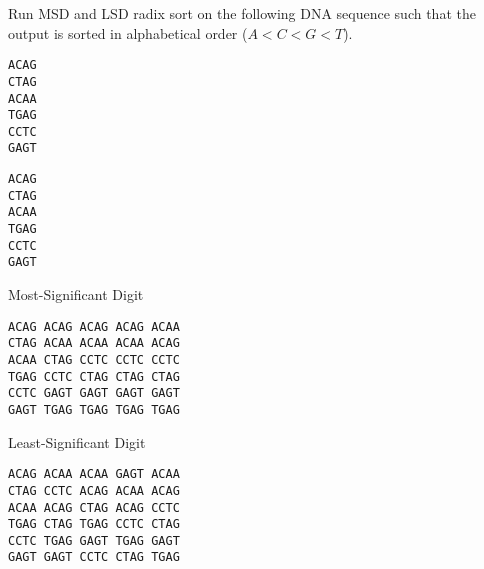 \begin{blocksection}
\question Run MSD and LSD radix sort on the following DNA sequence such that
the output is sorted in alphabetical order ($A < C < G < T$).

\ifprintanswers\else
\begin{verbatim}
ACAG
CTAG
ACAA
TGAG
CCTC
GAGT
\end{verbatim}

\begin{verbatim}
ACAG
CTAG
ACAA
TGAG
CCTC
GAGT
\end{verbatim}
\vspace{5mm}
\fi

\begin{solution}
Most-Significant Digit
\begin{verbatim}
ACAG ACAG ACAG ACAG ACAA
CTAG ACAA ACAA ACAA ACAG
ACAA CTAG CCTC CCTC CCTC
TGAG CCTC CTAG CTAG CTAG
CCTC GAGT GAGT GAGT GAGT
GAGT TGAG TGAG TGAG TGAG
\end{verbatim}

Least-Significant Digit
\begin{verbatim}
ACAG ACAA ACAA GAGT ACAA
CTAG CCTC ACAG ACAA ACAG
ACAA ACAG CTAG ACAG CCTC
TGAG CTAG TGAG CCTC CTAG
CCTC TGAG GAGT TGAG GAGT
GAGT GAGT CCTC CTAG TGAG
\end{verbatim}
\end{solution}

\vspace{\parskip}
\end{blocksection}
